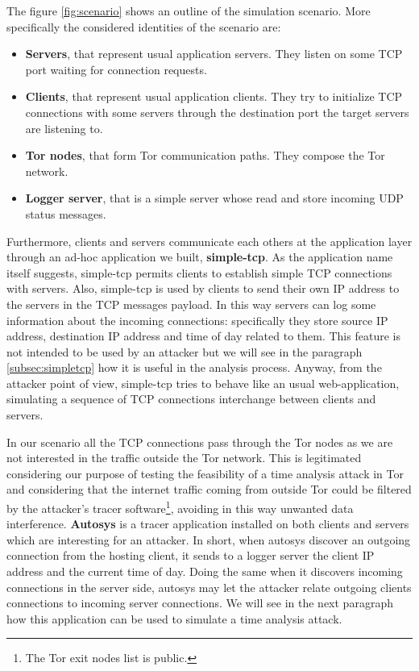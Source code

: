 The figure \ref{fig:scenario} shows an outline of the simulation
scenario. More specifically the considered identities of the scenario are:
\begin{itemize} 
	\item \textbf{Servers}, that represent usual application servers.
They listen on some TCP port waiting for connection requests.
	\item \textbf{Clients}, that represent usual application clients.
They try to initialize TCP connections with some servers through the
destination port the target servers are listening to.
	\item \textbf{Tor nodes}, that form Tor communication paths. They
compose the Tor network.
	\item \textbf{Logger server}, that is a simple server whose read
and store incoming UDP status messages.
\end{itemize}

Furthermore, clients and servers communicate each others at the application layer
through an ad-hoc application we built, \textbf{simple-tcp}. As the
application name itself suggests, simple-tcp permits clients to
establish simple TCP connections with servers. Also, simple-tcp is used
by clients to send their own IP address to the servers in the TCP
messages payload.
In this way servers can log some information about the incoming connections:
specifically they store source IP address,
destination IP address and time of day related to them. 
This feature is not intended to be used by an attacker but
we will see in the paragraph \ref{subsec:simpletcp} how
it is useful in the analysis process. Anyway, from the attacker point of
view, simple-tcp tries to behave like an usual web-application,
simulating a sequence of TCP connections interchange between clients and
servers. 

In our scenario all the TCP connections pass through the Tor
nodes as we are not interested in the traffic outside the Tor network. 
This is legitimated considering our purpose of testing the feasibility of a time analysis
attack in Tor and considering that the internet traffic coming from
outside Tor could be filtered by the attacker's tracer
software\footnote{The Tor exit nodes list is public\cite{torstatus}.}, avoiding in this
way unwanted data interference.
\textbf{Autosys} is a tracer application installed on both clients and
servers which are interesting for an attacker.  
In short, when autosys discover an outgoing connection from the
hosting client, it sends to a logger server the client IP address and
the current time of day. Doing the same when it discovers incoming
connections in the server side, autosys may let the attacker relate outgoing
clients connections 
 to incoming server connections. We will see in the next
paragraph how this application can be used to simulate a time analysis
attack.

